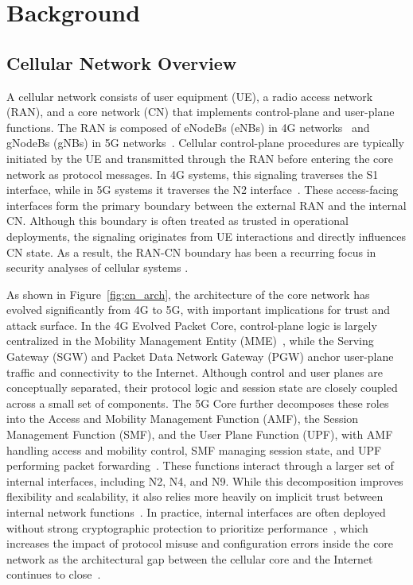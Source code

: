 \section{Background}
\label{sec: background}

\vspace{1mm}
\subsection{Cellular Network Overview}

A cellular network consists of user equipment (UE), a radio access network (RAN), and a core network (CN) that implements control-plane and user-plane functions. The RAN is composed of eNodeBs (eNBs) in 4G networks~\cite{3gpp23002} and gNodeBs (gNBs) in 5G networks~\cite{3gpp23501}. Cellular control-plane procedures are typically initiated by the UE and transmitted through the RAN before entering the core network as protocol messages. In 4G systems, this signaling traverses the S1 interface, while in 5G systems it traverses the N2 interface~\cite{3gpp23501,3gpp38413}. These access-facing interfaces form the primary boundary between the external RAN and the internal CN. Although this boundary is often treated as trusted in operational deployments, the signaling originates from UE interactions and directly influences CN state. As a result, the RAN-CN boundary has been a recurring focus in security analyses of cellular systems \cite{hussain2018lteinspector, bennett2024ransacked, khandker2024astra}.

As shown in Figure~\ref{fig:cn_arch}, the architecture of the core network has evolved significantly from 4G to 5G, with important implications for trust and attack surface. In the 4G Evolved Packet Core, control-plane logic is largely centralized in the Mobility Management Entity (MME)~\cite{3gpp29274}, while the Serving Gateway (SGW) and Packet Data Network Gateway (PGW) anchor user-plane traffic and connectivity to the Internet. Although control and user planes are conceptually separated, their protocol logic and session state are closely coupled across a small set of components. The 5G Core further decomposes these roles into the Access and Mobility Management Function (AMF), the Session Management Function (SMF), and the User Plane Function (UPF), with AMF handling access and mobility control, SMF managing session state, and UPF performing packet forwarding~\cite{3gpp23501}. These functions interact through a larger set of internal interfaces, including N2, N4, and N9. While this decomposition improves flexibility and scalability, it also relies more heavily on implicit trust between internal network functions~\cite{akon2023formal}. In practice, internal interfaces are often deployed without strong cryptographic protection to prioritize performance~\cite{3gpp33210,donegan2011ipsec}, which increases the impact of protocol misuse and configuration errors inside the core network as the architectural gap between the cellular core and the Internet continues to close~\cite{zhang2025invade,akon2023formal}.


